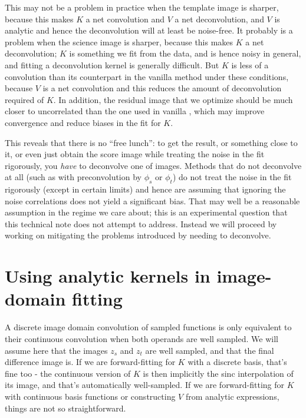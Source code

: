 \documentclass[DM,authoryear,toc]{lsstdoc}
\newcommand{\ZOGY}{\citetalias{2016ApJ...830...27Z}}
\newcommand{\AL}{\citetalias{1998ApJ...503..325A}}
\begin{document}
This may not be a problem in practice when the template image is sharper, because this makes $K$ a net convolution and $V$ a net deconvolution, and $V$ is analytic and hence the deconvolution will at least be noise-free.
It probably is a problem when the science image is sharper, because this makes $K$ a net deconvolution; $K$ is something we fit from the data, and is hence noisy in general, and fitting a deconvolution kernel is generally difficult.
But $K$ is less of a convolution than its counterpart in the vanilla \AL{} method under these conditions, because $V$ is a net convolution and this reduces the amount of deconvolution required of $K$.
In addition, the residual image that we optimize should be much closer to uncorrelated than the one used in vanilla \AL{}, which may improve convergence and reduce biases in the fit for $K$.

This reveals that there is no ``free lunch'': to get the \ZOGY{} result, or something close to it, or even just obtain the score image while treating the noise in the fit rigorously, you \emph{have} to deconvolve one of images.
Methods that do not deconvolve at all (such as \AL{} with preconvolution by $\phi_s$ or $\phi_t$) do not treat the noise in the fit rigorously (except in certain limits) and hence are assuming that ignoring the noise correlations does not yield a significant bias.
That may well be a reasonable assumption in the regime we care about; this is an experimental question that this technical note does not attempt to address.
Instead we will proceed by working on mitigating the problems introduced by needing to deconvolve.

\section{Using analytic kernels in image-domain fitting}

\label{sec:analytic-kernels}

A discrete image domain convolution of sampled functions is only equivalent to their continuous convolution when both operands are well sampled.
We will assume here that the images $z_s$ and $z_t$ are well sampled, and that the final difference image is.
If we are forward-fitting for $K$ with a discrete basis, that's fine too - the continuous version of $K$ is then implicitly the sinc interpolation of its image, and that's automatically well-sampled.
If we are forward-fitting for $K$ with continuous basis functions or constructing $V$ from analytic expressions, things are not so straightforward.
\end{document}
